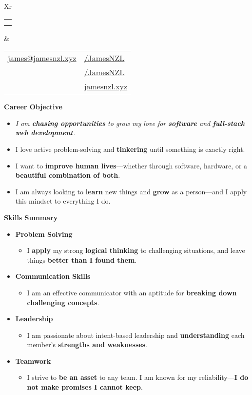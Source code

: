 \documentclass[11pt,a4paper]{article}[leftmargin=*]
\makeatletter
\def \fullname {James Bao}
\def \subtitle {}
\def \emailicon {\faAt}
\def \emaillink {mailto:james@jamesnzl.xyz}
\def \emailtext {james@jamesnzl.xyz}
\def \phoneicon {\faMobile}
\def \phonetext {+64 22 410 1580}
\def \addressicon {\faMapMarker*}
\def \addresstext {Auckland, New Zealand}
\def \linkedinicon {\faLinkedin}
\def \linkedinlink {https://www.linkedin.com/in/jamesnzl/}
\def \linkedintext {/JamesNZL}
\def \githubicon {\faGithub}
\def \githublink {https://github.com/jamesnzl}
\def \githubtext {/JamesNZL}
\def \websiteicon {\faGlobe}
\def \websitelink {https://jamesnzl.xyz/}
\def \websitetext {jamesnzl.xyz}
\def \headertype {\doublecol} %
\def \entryspacing {-0pt}
\def \email {\emailicon \hspace{3pt}\href{\emaillink}{\emailtext}}
\def \phone {\phoneicon \hspace{3pt}{ \phonetext}}
\def \address {\addressicon \hspace{3pt}{\addresstext}}
\def \linkedin {\linkedinicon \hspace{3pt}\href{\linkedinlink}{\linkedintext}}
\def \github {\githubicon \hspace{3pt}\href{\githublink}{\githubtext}}
\def \website {\websiteicon \hspace{3pt}\href{\websitelink}{\websitetext}}
\renewcommand{\section}[2]{\vspace{5pt}
  \colorbox{secondary}{\color{white}\raggedbottom\normalsize\textbf{{#1}{\hspace{2pt}#2}}}
}
\newcommand{\resumeEntryStart}{\begin{itemize}[leftmargin=2.5mm]}
\newcommand{\resumeEntryEnd}{\end{itemize}\vspace{\entryspacing}}
\newcommand{\resumeItemListStart}{\begin{itemize}[leftmargin=4.5mm]}
\newcommand{\resumeItemListEnd}{\end{itemize}}
\newcommand{\resumeItem}[1]{
  \item\small{
    {#1 \vspace{-2pt}}
  }
}
\newcommand{\resumeEntryS}[2]{
  \item[]\small{
    \textbf{\color{primary}#1 }{ #2 \vspace{-4pt}}
  }
}
\newcommand{\resumeEntryE}[1]{
  \item[]\small{
    \textit{\color{accent}\small#1 \vspace{-6pt}}
  }\\
}
\newcommand{\resumeEntryP}[1]{
  \item[]\small{
    #1 \vspace{-6pt}
  }\\
}
\newcommand{\resumeBf}[1]{\small\textbf{\color{halfbold}#1}}
\newcommand{\doublecol}[6]{
  \begin{tabularx}{\textwidth}{Xr}
    {
      \begin{tabular}[c]{l}
        \fontsize{35}{45}\selectfont{\color{primary}{{\textbf{\fullname}}}} \\
        {\textit{\subtitle}} %
      \end{tabular}
    } & {
      \begin{tabular}[c]{l@{\hspace{1.5em}}l}
        {\small#4} & {\small#1} \\
        {\small#5} & {\small#2} \\
        {\small#6} & {\small#3}
      \end{tabular}
    }
  \end{tabularx}
}
\newcommand{\singlecol}[6]{
  \begin{tabularx}{\textwidth}{Xr}
    {
      \begin{tabular}[b]{l}
        \fontsize{35}{45}\selectfont{\color{primary}{{\textbf{\fullname}}}} \\
        {\textit{\subtitle}} %
      \end{tabular}
    } & {
      \begin{tabular}[c]{l}
        {\small#1} \\
        {\small#2} \\
        {\small#3} \\
        {\small#4} \\
        {\small#5} \\
        {\small#6}
      \end{tabular}
    }
  \end{tabularx}
}
\makeatother
\begin{document}

\headertype{\linkedin}{\github}{\website}{\email}{\phone}{\address} %
\vspace{-10pt} %


\section{\faCrosshairs}{Career Objective}

\resumeEntryStart
\resumeEntryE{I am \resumeBf{chasing opportunities} to grow my love for \resumeBf{software} and \resumeBf{full-stack web development}.}

\resumeEntryP{I love active problem-solving and \resumeBf{tinkering} until something is exactly right.}

\resumeEntryP{I want to \resumeBf{improve human lives}---whether through software, hardware, or a \resumeBf{beautiful combination of both}.}

\resumeEntryP{I am always looking to \resumeBf{learn} new things and \resumeBf{grow} as a person—and I apply this mindset to everything I do.}
\resumeEntryEnd


\section{\faAngleDoubleUp}{Skills Summary}

\resumeEntryStart
\resumeEntryS{Problem Solving}{}
\resumeItemListStart
\resumeItem{
  I \resumeBf{apply} my strong \resumeBf{logical thinking} to challenging situations, and leave things \resumeBf{better than I found them}.
}
\resumeItemListEnd

\resumeEntryS{Communication Skills}{}
\resumeItemListStart
\resumeItem{
  I am an effective communicator with an aptitude for \resumeBf{breaking down challenging concepts}.
}
\resumeItemListEnd

\resumeEntryS{Leadership}{}
\resumeItemListStart
\resumeItem{
  I am passionate about intent-based leadership and \resumeBf{understanding} each member's \resumeBf{strengths and weaknesses}.
}
\resumeItemListEnd

\resumeEntryS{Teamwork}{}
\resumeItemListStart
\resumeItem{
  I strive to \resumeBf{be an asset} to any team. I am known for my reliability---\resumeBf{I do not make promises I cannot keep}.
}
\resumeItemListEnd
\resumeEntryEnd
\end{document}
